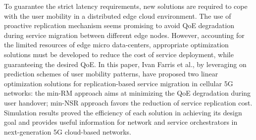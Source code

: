 \cite{farris2017optimizing}
To guarantee the strict latency requirements, new solutions are required to cope with the user mobility in a distributed edge cloud environment. The use of proactive replication mechanism seems promising to avoid QoE degradation during service migration between different edge nodes. However, accounting for the limited resources of edge micro data-centers, appropriate optimization solutions must be developed to reduce the cost of service deployment, while guaranteeing the desired QoE. In this paper, Ivan Farris et al., by leveraging on prediction schemes of user mobility patterns, have proposed two linear optimization solutions for replication-based service migration in cellular 5G networks: the min-RM approach aims at minimizing the QoE degradation during user handover; min-NSR approach favors the reduction of service replication cost. Simulation results proved the efficiency of each solution in achieving its design goal and provides useful information for network and service orchestrators in next-generation 5G cloud-based networks.






